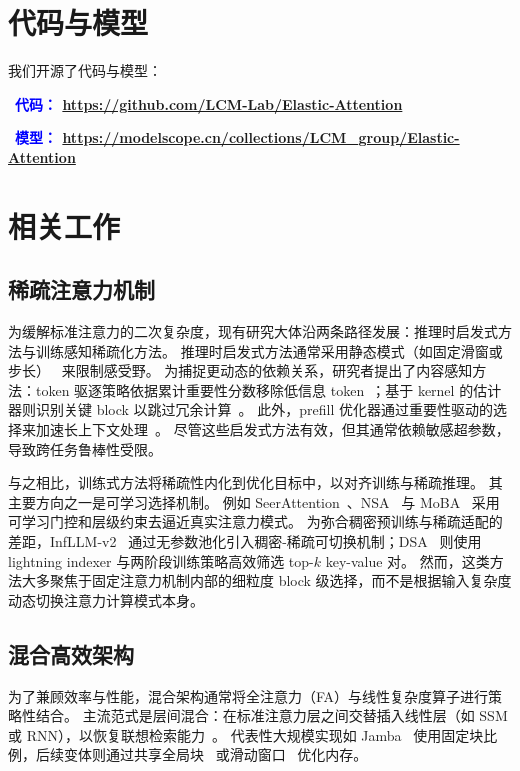 \section{代码与模型}
我们开源了代码与模型：

\faGithub\ \textbf{\textcolor{blue}{代码：} \href{https://github.com/LCM-Lab/Elastic-Attention}{https://github.com/LCM-Lab/Elastic-Attention}}

\faDatabase\ \textbf{\textcolor{blue}{模型：} \href{https://modelscope.cn/collections/LCM\_group/Elastic-Attention}{https://modelscope.cn/collections/LCM\_group/Elastic-Attention}}

\section{相关工作}
\label{sec:related_work}

\subsection{稀疏注意力机制}
\label{subsec:train_ssa}
为缓解标准注意力的二次复杂度，现有研究大体沿两条路径发展：推理时启发式方法与训练感知稀疏化方法。
推理时启发式方法通常采用静态模式（如固定滑窗或步长）~\citep{streamingllm, TriangleMix, Beltagy2020Longformer} 来限制感受野。
为捕捉更动态的依赖关系，研究者提出了内容感知方法：token 驱逐策略依据累计重要性分数移除低信息 token~\citep{h2o, snapkv, scissorhands}；基于 kernel 的估计器则识别关键 block 以跳过冗余计算~\citep{jiang2024minference}。
此外，prefill 优化器通过重要性驱动的选择来加速长上下文处理~\citep{flexprefill, xattention, spargeattn, peng2025acceleratingprefillinglongcontextllms, ji2025salelowbitestimation}。
尽管这些启发式方法有效，但其通常依赖敏感超参数，导致跨任务鲁棒性受限。

与之相比，训练式方法将稀疏性内化到优化目标中，以对齐训练与稀疏推理。
其主要方向之一是可学习选择机制。
例如 SeerAttention~\citep{gao2024seerattention}、NSA~\citep{NSA} 与 MoBA~\citep{moba} 采用可学习门控和层级约束去逼近真实注意力模式。
为弥合稠密预训练与稀疏适配的差距，InfLLM-v2~\citep{infllmv2} 通过无参数池化引入稠密-稀疏可切换机制；DSA~\citep{deepseekai2024deepseekv32} 则使用 lightning indexer 与两阶段训练策略高效筛选 top-$k$ key-value 对。
然而，这类方法大多聚焦于固定注意力机制内部的细粒度 block 级选择，而不是根据输入复杂度动态切换注意力计算模式本身。

\subsection{混合高效架构}
\label{subsec:hybrid_arch}
为了兼顾效率与性能，混合架构通常将全注意力（FA）与线性复杂度算子进行策略性结合。
主流范式是层间混合：在标准注意力层之间交替插入线性层（如 SSM 或 RNN），以恢复联想检索能力~\citep{ku2025systemsalgorithmsconvolutionalmultihybrid,dao2024transformersssmsgeneralizedmodels}。
代表性大规模实现如 Jamba~\citep{lieber2024jambahybridtransformermambalanguage} 使用固定块比例，后续变体则通过共享全局块~\citep{glorioso2024zambacompact7bssm} 或滑动窗口~\citep{ren2024samba} 优化内存。

